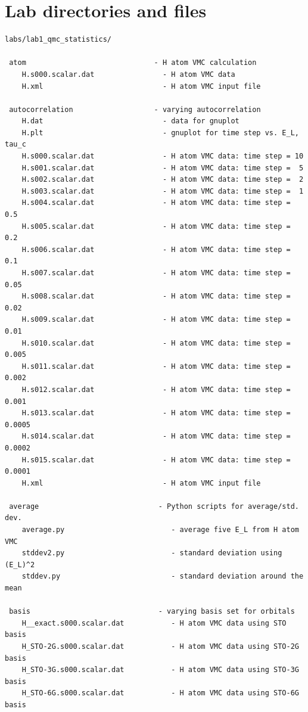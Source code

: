 \section{Lab directories and files}

\begin{shaded} 
\begin{verbatim}
labs/lab1_qmc_statistics/

 atom                              - H atom VMC calculation
    H.s000.scalar.dat                - H atom VMC data 
    H.xml                            - H atom VMC input file

 autocorrelation                   - varying autocorrelation
    H.dat                            - data for gnuplot
    H.plt                            - gnuplot for time step vs. E_L, tau_c
    H.s000.scalar.dat                - H atom VMC data: time step = 10 
    H.s001.scalar.dat                - H atom VMC data: time step =  5 
    H.s002.scalar.dat                - H atom VMC data: time step =  2 
    H.s003.scalar.dat                - H atom VMC data: time step =  1 
    H.s004.scalar.dat                - H atom VMC data: time step =  0.5
    H.s005.scalar.dat                - H atom VMC data: time step =  0.2
    H.s006.scalar.dat                - H atom VMC data: time step =  0.1
    H.s007.scalar.dat                - H atom VMC data: time step =  0.05 
    H.s008.scalar.dat                - H atom VMC data: time step =  0.02
    H.s009.scalar.dat                - H atom VMC data: time step =  0.01
    H.s010.scalar.dat                - H atom VMC data: time step =  0.005
    H.s011.scalar.dat                - H atom VMC data: time step =  0.002
    H.s012.scalar.dat                - H atom VMC data: time step =  0.001
    H.s013.scalar.dat                - H atom VMC data: time step =  0.0005
    H.s014.scalar.dat                - H atom VMC data: time step =  0.0002
    H.s015.scalar.dat                - H atom VMC data: time step =  0.0001
    H.xml                            - H atom VMC input file

 average                            - Python scripts for average/std. dev.
    average.py                         - average five E_L from H atom VMC
    stddev2.py                         - standard deviation using (E_L)^2
    stddev.py                          - standard deviation around the mean

 basis                              - varying basis set for orbitals
    H__exact.s000.scalar.dat           - H atom VMC data using STO basis
    H_STO-2G.s000.scalar.dat           - H atom VMC data using STO-2G basis
    H_STO-3G.s000.scalar.dat           - H atom VMC data using STO-3G basis
    H_STO-6G.s000.scalar.dat           - H atom VMC data using STO-6G basis


\end{verbatim}
\end{shaded}
